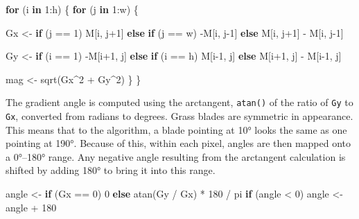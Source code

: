 \documentclass[
]{article}
\newenvironment{Shaded}{\begin{snugshade}}{\end{snugshade}}
\newcommand{\ControlFlowTok}[1]{\textcolor[rgb]{0.00,0.23,0.31}{\textbf{#1}}}
\newcommand{\DecValTok}[1]{\textcolor[rgb]{0.68,0.00,0.00}{#1}}
\newcommand{\FunctionTok}[1]{\textcolor[rgb]{0.28,0.35,0.67}{#1}}
\newcommand{\NormalTok}[1]{\textcolor[rgb]{0.00,0.23,0.31}{#1}}
\newcommand{\OtherTok}[1]{\textcolor[rgb]{0.00,0.23,0.31}{#1}}
\newcommand{\SpecialCharTok}[1]{\textcolor[rgb]{0.37,0.37,0.37}{#1}}
\begin{document}
\begin{Shaded}
\begin{Highlighting}[]
\ControlFlowTok{for}\NormalTok{ (i }\ControlFlowTok{in} \DecValTok{1}\SpecialCharTok{:}\NormalTok{h) \{}
  \ControlFlowTok{for}\NormalTok{ (j }\ControlFlowTok{in} \DecValTok{1}\SpecialCharTok{:}\NormalTok{w) \{}

\NormalTok{    Gx }\OtherTok{\textless{}{-}} \ControlFlowTok{if}\NormalTok{ (j }\SpecialCharTok{==} \DecValTok{1}\NormalTok{) M[i, j}\SpecialCharTok{+}\DecValTok{1}\NormalTok{] }
          \ControlFlowTok{else} \ControlFlowTok{if}\NormalTok{ (j }\SpecialCharTok{==}\NormalTok{ w) }\SpecialCharTok{{-}}\NormalTok{M[i, j}\DecValTok{{-}1}\NormalTok{] }
          \ControlFlowTok{else}\NormalTok{ M[i, j}\SpecialCharTok{+}\DecValTok{1}\NormalTok{] }\SpecialCharTok{{-}}\NormalTok{ M[i, j}\DecValTok{{-}1}\NormalTok{]}

\NormalTok{    Gy }\OtherTok{\textless{}{-}} \ControlFlowTok{if}\NormalTok{ (i }\SpecialCharTok{==} \DecValTok{1}\NormalTok{) }\SpecialCharTok{{-}}\NormalTok{M[i}\SpecialCharTok{+}\DecValTok{1}\NormalTok{, j] }
          \ControlFlowTok{else} \ControlFlowTok{if}\NormalTok{ (i }\SpecialCharTok{==}\NormalTok{ h) M[i}\DecValTok{{-}1}\NormalTok{, j] }
          \ControlFlowTok{else}\NormalTok{ M[i}\SpecialCharTok{+}\DecValTok{1}\NormalTok{, j] }\SpecialCharTok{{-}}\NormalTok{ M[i}\DecValTok{{-}1}\NormalTok{, j]}

\NormalTok{    mag }\OtherTok{\textless{}{-}} \FunctionTok{sqrt}\NormalTok{(Gx}\SpecialCharTok{\^{}}\DecValTok{2} \SpecialCharTok{+}\NormalTok{ Gy}\SpecialCharTok{\^{}}\DecValTok{2}\NormalTok{)}
\NormalTok{  \}}
\NormalTok{\}}
\end{Highlighting}
\end{Shaded}

The gradient angle is computed using the arctangent, \texttt{atan()} of
the ratio of \texttt{Gy} to \texttt{Gx}, converted from radians to
degrees. Grass blades are symmetric in appearance. This means that to
the algorithm, a blade pointing at 10° looks the same as one pointing at
190°. Because of this, within each pixel, angles are then mapped onto a
0°--180° range. Any negative angle resulting from the arctangent
calculation is shifted by adding 180° to bring it into this range.

\begin{Shaded}
\begin{Highlighting}[]
\NormalTok{angle }\OtherTok{\textless{}{-}} \ControlFlowTok{if}\NormalTok{ (Gx }\SpecialCharTok{==} \DecValTok{0}\NormalTok{) }\DecValTok{0} \ControlFlowTok{else} \FunctionTok{atan}\NormalTok{(Gy }\SpecialCharTok{/}\NormalTok{ Gx) }\SpecialCharTok{*} \DecValTok{180} \SpecialCharTok{/}\NormalTok{ pi}
\ControlFlowTok{if}\NormalTok{ (angle }\SpecialCharTok{\textless{}} \DecValTok{0}\NormalTok{) angle }\OtherTok{\textless{}{-}}\NormalTok{ angle }\SpecialCharTok{+} \DecValTok{180}
\end{Highlighting}
\end{Shaded}
\end{document}
